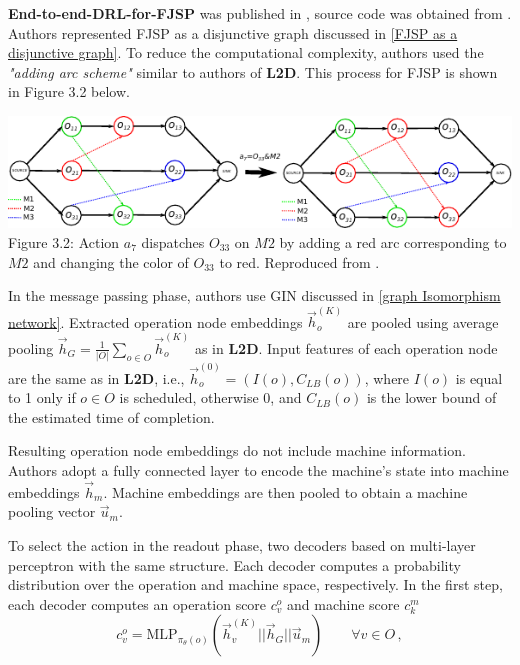 \textbf{End-to-end-DRL-for-FJSP} was published in \cite{LEI2022117796}, source code was obtained from \cite{github_end_to_end_drl_for_fjsp}. Authors represented FJSP as a disjunctive graph discussed in \ref{FJSP as a disjunctive graph}. To reduce the computational complexity, authors used the \textit{"adding arc scheme"} similar to authors of \textbf{L2D}. This process for FJSP is shown in Figure 3.2 below.
\begin{center}
    \includegraphics[width=\linewidth]{images/fjsp_adding_arcs.pdf}\\
    Figure 3.2: Action $a_7$ dispatches $O_{33}$ on $M2$ by adding a red arc corresponding to $M2$ and changing the color of $O_{33}$ to red. Reproduced from \cite{LEI2022117796}.
\end{center}
In the message passing phase, authors use GIN discussed in \ref{graph Isomorphism network}. Extracted operation node embeddings $\vec{h}_o^{(K)}$ are pooled using average pooling $\vec{h}_G = \frac{1}{|O|} \sum_{o \in O} \vec{h}_o^{(K)}$ as in \textbf{L2D}. Input features of each operation node are the same as in \textbf{L2D}, i.e., $\vec{h}_o^{(0)} = (I(o), C_{LB}(o))$, where $I(o)$ is equal to 1 only if $o \in O$ is scheduled, otherwise 0, and $C_{LB}(o)$ is the lower bound of the estimated time of completion.
\par
Resulting operation node embeddings do not include machine information. Authors adopt a fully connected layer to encode the machine's state into machine embeddings $\vec{h}_m$. Machine embeddings are then pooled to obtain a machine pooling vector $\vec{u}_m$. 
\par
To select the action in the readout phase, two decoders based on multi-layer perceptron with the same structure. Each decoder computes a probability distribution over the operation and machine space, respectively. In the first step, each decoder computes an operation score $c^o_{v}$ and machine score $c^m_{k}$ \cite{LEI2022117796}
\begin{equation}
    c^{o}_v = \text{MLP}_{\pi_{\theta}(o)} \left ( \vec{h}_v^{(K)} || \vec{h}_G || \vec{u}_m \right ) \hspace{2em} \forall v \in O \, ,
\end{equation}
